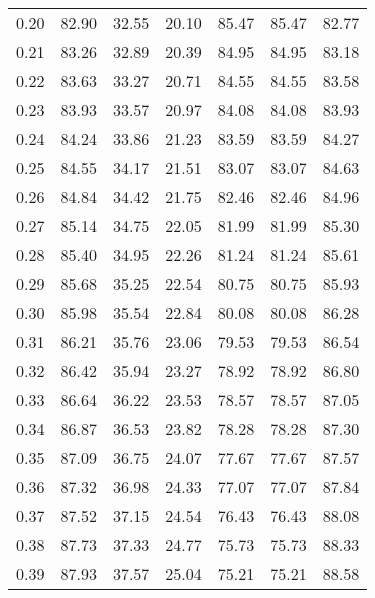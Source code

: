\begin{tabular}{|c|c|c|c|c|c|c|}
      0.20 &     82.90 &     32.55 &      20.10 &   85.47 &      85.47 &         82.77 \\
      0.21 &     83.26 &     32.89 &      20.39 &   84.95 &      84.95 &         83.18 \\
      0.22 &     83.63 &     33.27 &      20.71 &   84.55 &      84.55 &         83.58 \\
      0.23 &     83.93 &     33.57 &      20.97 &   84.08 &      84.08 &         83.93 \\
      0.24 &     84.24 &     33.86 &      21.23 &   83.59 &      83.59 &         84.27 \\
      0.25 &     84.55 &     34.17 &      21.51 &   83.07 &      83.07 &         84.63 \\
      0.26 &     84.84 &     34.42 &      21.75 &   82.46 &      82.46 &         84.96 \\
      0.27 &     85.14 &     34.75 &      22.05 &   81.99 &      81.99 &         85.30 \\
      0.28 &     85.40 &     34.95 &      22.26 &   81.24 &      81.24 &         85.61 \\
      0.29 &     85.68 &     35.25 &      22.54 &   80.75 &      80.75 &         85.93 \\
      0.30 &     85.98 &     35.54 &      22.84 &   80.08 &      80.08 &         86.28 \\
      0.31 &     86.21 &     35.76 &      23.06 &   79.53 &      79.53 &         86.54 \\
      0.32 &     86.42 &     35.94 &      23.27 &   78.92 &      78.92 &         86.80 \\
      0.33 &     86.64 &     36.22 &      23.53 &   78.57 &      78.57 &         87.05 \\
      0.34 &     86.87 &     36.53 &      23.82 &   78.28 &      78.28 &         87.30 \\
      0.35 &     87.09 &     36.75 &      24.07 &   77.67 &      77.67 &         87.57 \\
      0.36 &     87.32 &     36.98 &      24.33 &   77.07 &      77.07 &         87.84 \\
      0.37 &     87.52 &     37.15 &      24.54 &   76.43 &      76.43 &         88.08 \\
      0.38 &     87.73 &     37.33 &      24.77 &   75.73 &      75.73 &         88.33 \\
      0.39 &     87.93 &     37.57 &      25.04 &   75.21 &      75.21 &         88.58 \\

\end{tabular}
